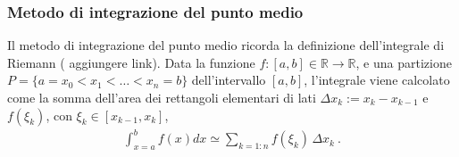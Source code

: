 \documentclass[letterpaper,10pt,english]{jupyterBook}
\begin{document}
\subsubsection{Metodo di integrazione del punto medio}
\label{\detokenize{ch/numerics/integrals:metodo-di-integrazione-del-punto-medio}}
\sphinxAtStartPar
Il metodo di integrazione del punto medio ricorda la definizione dell’integrale di Riemann ( aggiungere link). Data la funzione \(f:[a,b] \in \mathbb{R} \rightarrow \mathbb{R}\), e una partizione \(P = \{ a = x_0 < x_1 < \dots < x_n = b \}\) dell’intervallo \([a,b]\), l’integrale viene calcolato come la somma dell’area dei rettangoli elementari di lati \(\Delta x_k := x_k - x_{k-1}\) e \(f(\xi_k)\), con \(\xi_k \in [x_{k-1}, x_k]\),
\begin{equation*}
\begin{split}\int_{x=a}^{b} f(x) dx \simeq \sum_{k=1:n} f(\xi_k) \, \Delta x_k \ . \end{split}
\end{equation*}
\end{document}
